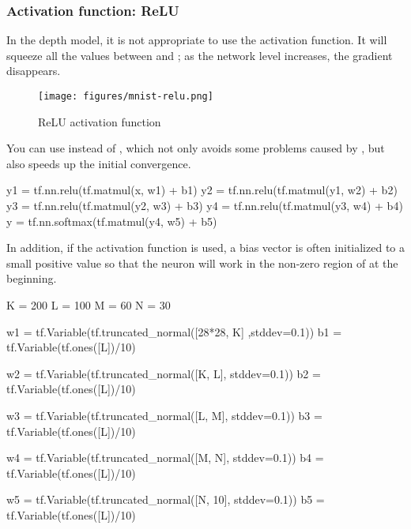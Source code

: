 \begin{content}
\begin{content}
\subsubsection{Activation function: ReLU}
In the depth model, it is not appropriate to use the  activation function. It will squeeze all the values ​​between  and ; as the network level increases, the gradient disappears.

\begin{figure}[H]
  \centering
  \texttt{[image: figures/mnist-relu.png]}
  \caption{ReLU activation function}
  \label{fig:mnist-relu}
\end{figure}

You can use  instead of , which not only avoids some problems caused by , but also speeds up the initial convergence.

\begin{leftbar}
\begin{python}
y1 = tf.nn.relu(tf.matmul(x,  w1) + b1)
y2 = tf.nn.relu(tf.matmul(y1, w2) + b2)
y3 = tf.nn.relu(tf.matmul(y2, w3) + b3)
y4 = tf.nn.relu(tf.matmul(y3, w4) + b4)
y  = tf.nn.softmax(tf.matmul(y4, w5) + b5)
\end{python}
\end{leftbar}

In addition, if the  activation function is used, a bias vector is often initialized to a small positive value so that the neuron will work in the non-zero region of  at the beginning.

\begin{leftbar}
\begin{python}
K = 200
L = 100
M = 60
N = 30

w1 = tf.Variable(tf.truncated_normal([28*28, K] ,stddev=0.1)) 
b1 = tf.Variable(tf.ones([L])/10)

w2 = tf.Variable(tf.truncated_normal([K, L], stddev=0.1))
b2 = tf.Variable(tf.ones([L])/10)

w3 = tf.Variable(tf.truncated_normal([L, M], stddev=0.1)) 
b3 = tf.Variable(tf.ones([L])/10)

w4 = tf.Variable(tf.truncated_normal([M, N], stddev=0.1)) 
b4 = tf.Variable(tf.ones([L])/10)

w5 = tf.Variable(tf.truncated_normal([N, 10], stddev=0.1)) 
b5 = tf.Variable(tf.ones([L])/10)
\end{python}
\end{leftbar}


\end{content}
\end{content}
